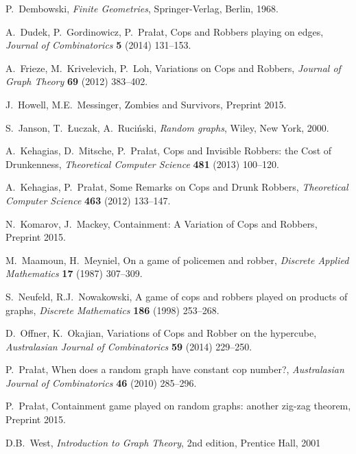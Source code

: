 \documentclass[12pt]{amsart}
\begin{document}
\begin{thebibliography}{99}
 P.\ Dembowski, \emph{Finite Geometries}, Springer-Verlag, Berlin, 1968.

 A.\ Dudek, P.\ Gordinowicz, P.\ Pra{\l}at, Cops and Robbers playing on edges, \emph{Journal of Combinatorics} \textbf{5} (2014) 131--153.

 A.\ Frieze, M.\ Krivelevich, P.\ Loh, Variations on Cops and Robbers, \emph{Journal of Graph Theory} \textbf{69} (2012) 383--402.

 J.\ Howell, M.E.\ Messinger, Zombies and Survivors, Preprint 2015.

  S.~Janson, T.~{\L}uczak, A.~Ruci\'nski, {\em Random graphs}, Wiley, New York, 2000.

 A.\ Kehagias, D.\ Mitsche, P.\ Pra\l{}at, Cops and Invisible Robbers: the Cost of Drunkenness, \emph{Theoretical Computer Science} \textbf{481} (2013) 100--120.

 A.\ Kehagias, P.\ Pra\l{}at, Some Remarks on Cops and Drunk Robbers, \emph{Theoretical Computer Science} \textbf{463} (2012) 133--147.

 N.\ Komarov, J.\ Mackey, Containment: A Variation of Cops and Robbers, Preprint 2015.

 M.\ Maamoun, H.\ Meyniel, On a game of policemen and robber, \emph{Discrete Applied Mathematics} \textbf{17} (1987) 307--309.

 S.\ Neufeld, R.J.\ Nowakowski, A game of cops and robbers played on products of graphs, \emph{Discrete Mathematics} \textbf{186} (1998) 253--268.

 D.\ Offner, K.\ Okajian, Variations of Cops and Robber on the hypercube, \emph{Australasian Journal of Combinatorics} \textbf{59} (2014) 229--250.

 P.\ Pra\l{}at, When does a random graph have constant cop number?, \emph{Australasian Journal of Combinatorics} \textbf{46} (2010) 285--296.

 P.\ Pra\l{}at, Containment game played on random graphs: another zig-zag theorem, Preprint 2015.

  D.B.\ West, \emph{Introduction to Graph Theory}, 2nd edition, Prentice Hall, 2001

\end{thebibliography}
\end{document}
